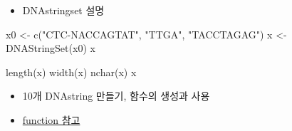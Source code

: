 \documentclass[
]{book}
\newenvironment{Shaded}{\begin{snugshade}}{\end{snugshade}}
\newcommand{\FunctionTok}[1]{\textcolor[rgb]{0.00,0.00,0.00}{#1}}
\newcommand{\NormalTok}[1]{#1}
\newcommand{\OtherTok}[1]{\textcolor[rgb]{0.56,0.35,0.01}{#1}}
\newcommand{\StringTok}[1]{\textcolor[rgb]{0.31,0.60,0.02}{#1}}
\providecommand{\tightlist}{%
  \setlength{\itemsep}{0pt}\setlength{\parskip}{0pt}}
\begin{document}
\begin{itemize}
\tightlist
\item
  DNAstringset 설명
\end{itemize}

\begin{Shaded}
\begin{Highlighting}[]
\NormalTok{x0 }\OtherTok{\textless{}{-}} \FunctionTok{c}\NormalTok{(}\StringTok{"CTC{-}NACCAGTAT"}\NormalTok{, }\StringTok{"TTGA"}\NormalTok{, }\StringTok{"TACCTAGAG"}\NormalTok{)}
\NormalTok{x }\OtherTok{\textless{}{-}} \FunctionTok{DNAStringSet}\NormalTok{(x0)}
\NormalTok{x}

\FunctionTok{length}\NormalTok{(x)}
\FunctionTok{width}\NormalTok{(x)}
\FunctionTok{nchar}\NormalTok{(x)}
\NormalTok{x}
\end{Highlighting}
\end{Shaded}

\begin{itemize}
\tightlist
\item
  10개 DNAstring 만들기, 함수의 생성과 사용
\item
  \href{https://greendaygh.github.io/kribbr2022/r-programming.html\#functions}{function 참고}
\end{itemize}
\end{document}
